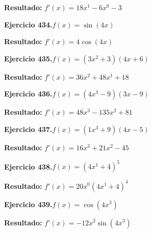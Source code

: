 \documentclass[10pt,a4paper]{article}
\begin{document}
\begin{solbox}
\textbf{Resultado:} \(\displaystyle f'(x) = 18x^{1} -6x^{0} -3\)
\end{solbox}

\begin{ejbox}
\textbf{Ejercicio 434.}\quad $f(x) = \sin(4x)$
\end{ejbox}

\begin{solbox}
\textbf{Resultado:} \(\displaystyle f'(x) = 4\cos(4x)\)
\end{solbox}

\begin{ejbox}
\textbf{Ejercicio 435.}\quad $f(x) = (3x^{2} +3)(4x +6)$
\end{ejbox}

\begin{solbox}
\textbf{Resultado:} \(\displaystyle f'(x) = 36x^{2} +48x^{1} +18\)
\end{solbox}

\newpage
\begin{ejbox}
\textbf{Ejercicio 436.}\quad $f(x) = (4x^{3} -9)(3x -9)$
\end{ejbox}

\begin{solbox}
\textbf{Resultado:} \(\displaystyle f'(x) = 48x^{3} -135x^{2} +81\)
\end{solbox}

\begin{ejbox}
\textbf{Ejercicio 437.}\quad $f(x) = (1x^{3} +9)(4x -5)$
\end{ejbox}

\begin{solbox}
\textbf{Resultado:} \(\displaystyle f'(x) = 16x^{3} +21x^{2} -45\)
\end{solbox}

\begin{ejbox}
\textbf{Ejercicio 438.}\quad $f(x) = (4x^{1} +4)^{5}$
\end{ejbox}

\begin{solbox}
\textbf{Resultado:} \(\displaystyle f'(x) = 20x^{0}(4x^{1} +4)^{4}\)
\end{solbox}

\newpage
\begin{ejbox}
\textbf{Ejercicio 439.}\quad $f(x) = \cos(4x^{3})$
\end{ejbox}

\begin{solbox}
\textbf{Resultado:} \(\displaystyle f'(x) = -12x^{2}\sin(4x^{3})\)
\end{solbox}
\end{document}
